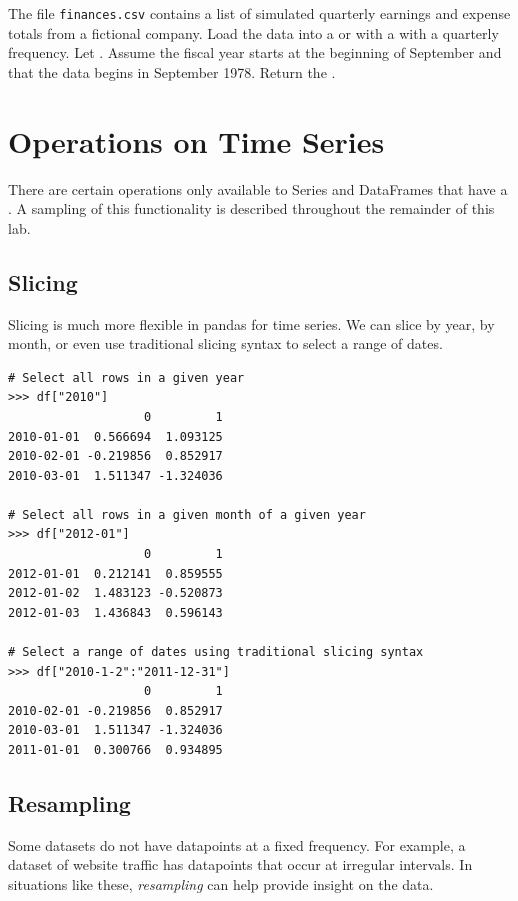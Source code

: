 \begin{problem} %
The file \texttt{finances.csv} contains a list of simulated quarterly earnings and expense totals from a fictional company.
Load the data into a  or  with a  with a quarterly frequency.
Let .
Assume the fiscal year starts at the beginning of September and that the data begins in September 1978.
Return the .
\end{problem}

\section*{Operations on Time Series}

There are certain operations only available to Series and DataFrames that have a . A sampling of this functionality is described throughout the remainder of this lab.

\subsection*{Slicing}

Slicing is much more flexible in pandas for time series. We can slice by year, by month, or even use traditional slicing syntax to select a range of dates.

\begin{lstlisting}
# Select all rows in a given year
>>> df["2010"]
                   0         1
2010-01-01  0.566694  1.093125
2010-02-01 -0.219856  0.852917
2010-03-01  1.511347 -1.324036

# Select all rows in a given month of a given year
>>> df["2012-01"]
                   0         1
2012-01-01  0.212141  0.859555
2012-01-02  1.483123 -0.520873
2012-01-03  1.436843  0.596143

# Select a range of dates using traditional slicing syntax
>>> df["2010-1-2":"2011-12-31"]
                   0         1
2010-02-01 -0.219856  0.852917
2010-03-01  1.511347 -1.324036
2011-01-01  0.300766  0.934895
\end{lstlisting}

\subsection*{Resampling} %

Some datasets do not have datapoints at a fixed frequency.
For example, a dataset of website traffic has datapoints that occur at irregular intervals.
In situations like these, \emph{resampling} can help provide insight on the data.

